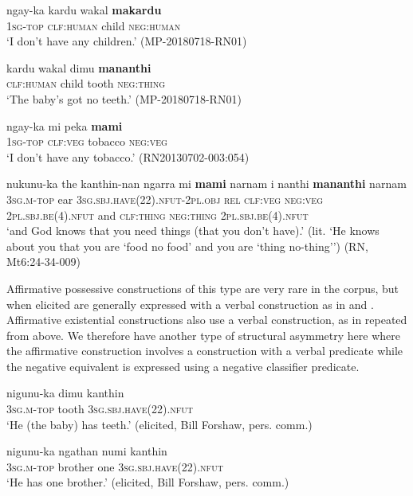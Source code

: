\documentclass[output=paper,colorlinks,citecolor=brown]{langscibook}
\begin{document}
\ea\label{ex:mur:60}
    \gll ngay-ka kardu wakal \textbf{makardu}\\
          \textsc{1sg-top} \textsc{clf:human} child \textsc{neg:human}\\
    \glt ‘I don’t have any children.’ (MP-20180718-RN01)
\z 

\ea\label{ex:mur:61}
    \gll kardu wakal dimu \textbf{mananthi}\\
         \textsc{clf:human} child tooth \textsc{neg:thing}\\
    \glt ‘The baby’s got no teeth.’ (MP-20180718-RN01)
\z 

\ea\label{ex:mur:62}
    \gll ngay-ka mi peka \textbf{mami} \\
         \textsc{1sg-top} \textsc{clf:veg} tobacco \textsc{neg:veg}\\
    \glt ‘I don’t have any tobacco.’ (RN20130702-003:054)
\z
         
\ea\label{ex:mur:63}
    \gll nukunu-ka the kanthin-nan ngarra mi \textbf{mami} narnam i nanthi \textbf{mananthi} narnam \\
         \textsc{3sg.m-top} ear \textsc{3sg.sbj.have(22).nfut-2pl.obj} \textsc{rel} \textsc{clf:veg} \textsc{neg:veg} \textsc{2pl.sbj.be(4).nfut} and \textsc{clf:thing} \textsc{neg:thing} \textsc{2pl.sbj.be(4).nfut}\\
    \glt ‘and God knows that you need things (that you don’t have).’ (lit. ‘He knows about you that you are ‘food no food’ and you are ‘thing no-thing’’) (RN, Mt6:24-34-009) 
\z 

Affirmative possessive constructions of this type are very rare in the corpus, but when elicited are generally expressed with a verbal construction as in  and . Affirmative existential constructions also use a verbal construction, as in  repeated from above. We therefore have another type of structural asymmetry here where the affirmative construction involves a construction with a verbal predicate while the negative equivalent is expressed using a negative classifier predicate.

\ea\label{ex:mur:64}
    \gll nigunu-ka dimu kanthin\\
         3\textsc{sg.m-top} tooth 3\textsc{sg.sbj.have(22).nfut}\\
    \glt ‘He (the baby) has teeth.’ (elicited, Bill Forshaw, pers. comm.)
\z

\ea\label{ex:mur:65}
    \gll nigunu-ka ngathan numi kanthin\\
         3\textsc{sg.m-top} brother one 3\textsc{sg.sbj.have(22).nfut}\\
    \glt  ‘He has one brother.’ (elicited, Bill Forshaw, pers. comm.)
\z 
\end{document}
